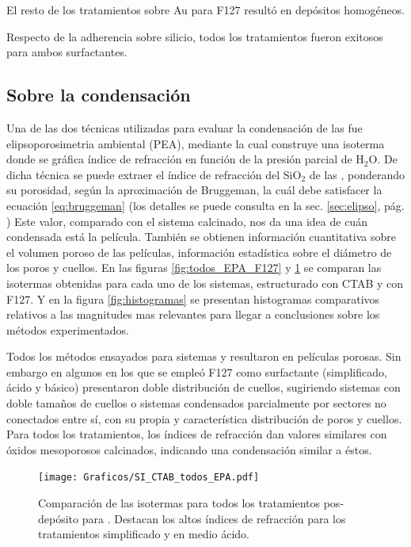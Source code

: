 			El resto de los tratamientos sobre Au para F127 resultó en depósitos homogéneos.

			Respecto de la adherencia sobre silicio, todos los tratamientos fueron exitosos para ambos surfactantes.

	\subsection{Sobre la condensación}

		Una de las dos técnicas utilizadas para evaluar la condensación de las \pdm\space fue elipsoporosimetria ambiental (PEA), mediante la cual construye una isoterma donde se gráfica índice de refracción en función de la presión parcial de H$_2$O. De dicha técnica se puede extraer el índice de refracción del SiO$_2$ de las \pdm, ponderando su porosidad, según la aproximación de Bruggeman, la cuál debe satisfacer la ecuación \ref{eq:bruggeman} \cite{Bruggeman1935} (los detalles se puede consulta en la sec. \ref{sec:elipso}, pág. \pageref{sec:elipso}) Este valor, comparado con el sistema calcinado, nos da una idea de cuán condensada está la película. También se obtienen información cuantitativa sobre el volumen poroso de las películas, información estadística sobre el diámetro de los poros y cuellos. En las figuras \ref{fig:todos_EPA_F127} y \ref{fig:todos_EPA_CTAB} se comparan las isotermas obtenidas para cada uno de los sistemas, estructurado con CTAB y con F127. Y en la figura \ref{fig:histogramas} se presentan histogramas comparativos relativos a las magnitudes mas relevantes para llegar a conclusiones sobre los métodos experimentados.

		Todos los métodos ensayados para sistemas \pdmF\space y \pdmC resultaron en películas porosas. Sin embargo en algunos en los que se empleó F127 como surfactante (simplificado, ácido y básico) presentaron doble distribución de cuellos, sugiriendo sistemas con doble tamaños de cuellos o sistemas condensados parcialmente por sectores no conectados entre sí, con su propia y característica distribución de poros y cuellos. Para todos los tratamientos, los índices de refracción dan valores similares con óxidos mesoporosos calcinados, indicando una condensación similar a éstos. 


			\begin{figure}[bh!]
		 	   	   \begin{center}
		 	   	   \texttt{[image: Graficos/SI\_CTAB\_todos\_EPA.pdf]}
			   	   \caption[Comparación PEA tratamientos alternativos (CTAB)]{Comparación de las isotermas para todos los tratamientos pos-depósito para \pdmC\space. Destacan los altos índices de refracción para los tratamientos simplificado y en medio ácido.}
				   \label{fig:todos_EPA_CTAB}	
				   \end{center}
				   \end{figure}
			
